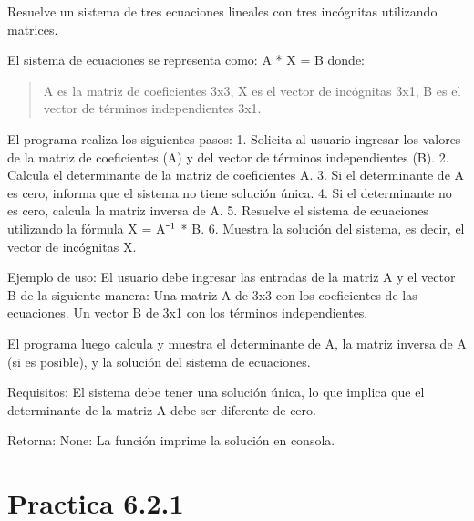 \documentclass[letterpaper,10pt,spanish]{sphinxmanual}
\begin{document}
\begin{fulllineitems}
\label{\detokenize{pr6:pr6.1_7.resolver_sistema_ecuaciones}}
\pysigstartsignatures
{}
\pysigstopsignatures
\sphinxAtStartPar
Resuelve un sistema de tres ecuaciones lineales con tres incógnitas utilizando matrices.

\sphinxAtStartPar
El sistema de ecuaciones se representa como:
A * X = B
donde:
\begin{quote}

\sphinxAtStartPar
A es la matriz de coeficientes 3x3,
X es el vector de incógnitas 3x1,
B es el vector de términos independientes 3x1.
\end{quote}

\sphinxAtStartPar
El programa realiza los siguientes pasos:
1. Solicita al usuario ingresar los valores de la matriz de coeficientes (A) y del vector de términos independientes (B).
2. Calcula el determinante de la matriz de coeficientes A.
3. Si el determinante de A es cero, informa que el sistema no tiene solución única.
4. Si el determinante no es cero, calcula la matriz inversa de A.
5. Resuelve el sistema de ecuaciones utilizando la fórmula X = A⁻\(\sp{\text{1}}\) * B.
6. Muestra la solución del sistema, es decir, el vector de incógnitas X.

\sphinxAtStartPar
Ejemplo de uso:
El usuario debe ingresar las entradas de la matriz A y el vector B de la siguiente manera:
\sphinxhyphen{} Una matriz A de 3x3 con los coeficientes de las ecuaciones.
\sphinxhyphen{} Un vector B de 3x1 con los términos independientes.

\sphinxAtStartPar
El programa luego calcula y muestra el determinante de A, la matriz inversa de A (si es posible), y la solución del sistema de ecuaciones.

\sphinxAtStartPar
Requisitos:
\sphinxhyphen{} El sistema debe tener una solución única, lo que implica que el determinante de la matriz A debe ser diferente de cero.

\sphinxAtStartPar
Retorna:
None: La función imprime la solución en consola.

\end{fulllineitems}



\section{Practica 6.2.1}
\label{\detokenize{pr6:module-pr6.2_1}}\label{\detokenize{pr6:practica-6-2-1}}
\end{document}
